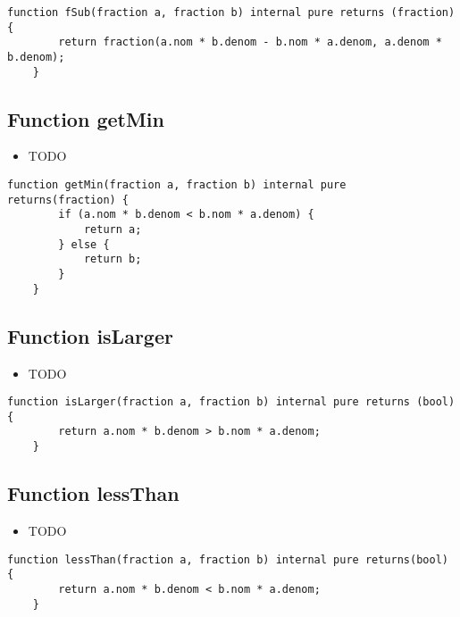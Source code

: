 \begin{lstlisting}[firstnumber=41]
    function fSub(fraction a, fraction b) internal pure returns (fraction) {
        return fraction(a.nom * b.denom - b.nom * a.denom, a.denom * b.denom);
    }
\end{lstlisting}

\subsection{Function getMin}

\noindent\begin{itemize}
\item TODO
\end{itemize}

\begin{lstlisting}[firstnumber=57]
    function getMin(fraction a, fraction b) internal pure returns(fraction) {
        if (a.nom * b.denom < b.nom * a.denom) {
            return a;
        } else {
            return b;
        }
    }
\end{lstlisting}

\subsection{Function isLarger}

\noindent\begin{itemize}
\item TODO
\end{itemize}

\begin{lstlisting}[firstnumber=45]
    function isLarger(fraction a, fraction b) internal pure returns (bool) {
        return a.nom * b.denom > b.nom * a.denom;
    }
\end{lstlisting}

\subsection{Function lessThan}

\noindent\begin{itemize}
\item TODO
\end{itemize}

\begin{lstlisting}[firstnumber=65]
    function lessThan(fraction a, fraction b) internal pure returns(bool) {
        return a.nom * b.denom < b.nom * a.denom;
    }
\end{lstlisting}

